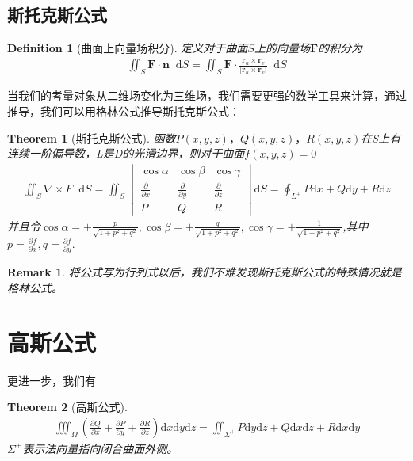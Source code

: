\documentclass[12pt,a4paper,UTF8]{ctexbook}
\theoremstyle{plain}
\newtheorem{theorem}{\indent Theorem}[section]
\newtheorem{definition}{\indent Definition}[section]
\newtheorem{remark}{\indent Remark}[section]
\newcommand{\diff}{\mathop{}\!\mathrm{d}} %
\newcommand{\vb}[1]{\mathbf{#1}}          %
\begin{document}
\subsection{斯托克斯公式}
\begin{definition}[曲面上向量场积分]
    定义对于曲面$S$上的向量场$\vb{F}$的积分为
    \begin{align*} 
        \iint_S \vb{F}\cdot \vb{n}\diff S = \iint_S \vb{F}\cdot \frac{\vb{r}_u\times\vb{r}_v}{|\vb{r}_u\times\vb{r}_v|}\diff S
    \end{align*} 
\end{definition}
当我们的考量对象从二维场变化为三维场，我们需要更强的数学工具来计算，通过推导，我们可以用格林公式推导斯托克斯公式：
\begin{theorem}[斯托克斯公式]函数$P(x,y,z)，Q(x,y,z)，R(x,y,z)$在S上有连续一阶偏导数，L是D的光滑边界，则对于曲面$f(x,y,z)=0$
\begin{align*}
    \iint_S \nabla \times F \diff S=\iint_{S}\begin{vmatrix}\cos \alpha&\cos \beta&\cos\gamma\\\frac{\partial}{\partial x}&\frac{\partial}{\partial y}&\frac{\partial}{\partial z}\\P&Q&R\end{vmatrix}\mathrm dS=\oint_{L^{+}} P\mathrm d x+Q\mathrm d y+R\mathrm d z
\end{align*}
并且令$\cos\alpha =\pm \frac{p}{\sqrt{1+p^2+q^2}},\cos\beta =\pm \frac{q}{\sqrt{1+p^2+q^2}},\cos\gamma =\pm \frac{1}{\sqrt{1+p^2+q^2}}$,其中$p=\frac{\partial f}{\partial x},q=\frac{\partial f}{\partial y}.$
\end{theorem}
\begin{remark}
将公式写为行列式以后，我们不难发现斯托克斯公式的特殊情况就是格林公式。
\end{remark}
\section{高斯公式}
更进一步，我们有
\begin{theorem}[高斯公式]
\begin{align*}
    \iiint_{\Omega}(\frac{\partial Q}{\partial x}+\frac{\partial P}{\partial y}+\frac{\partial R}{\partial z})\mathrm d{x}\mathrm{d}y\mathrm d z=\iint_{\Sigma^{+}} P\mathrm d y\mathrm d z+Q\mathrm d x\mathrm d z+R\mathrm d x\mathrm d y
\end{align*}
$\Sigma^{+}$表示法向量指向闭合曲面外侧。
\end{theorem}
\end{document}
